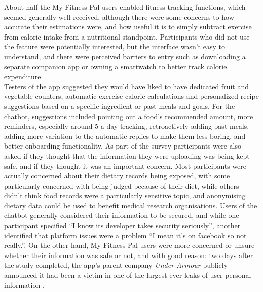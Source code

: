 About half the My Fitness Pal users enabled fitness tracking functions, which seemed generally well received, although there were some concerns to how accurate their estimations were, and how useful it is to simply subtract exercise from calorie intake from a nutritional standpoint. Participants who did not use the feature were potentially interested, but the interface wasn't easy to understand, and there were perceived barriers to entry such as downloading a separate companion app or owning a smartwatch to better track calorie expenditure.\\
Testers of the app suggested they would have liked to have dedicated fruit and vegetable counters, automatic exercise calorie calculations and personalized recipe suggestions based on a specific ingredient or past meals and goals. For the chatbot, suggestions included pointing out a food's recommended amount, more reminders, especially around 5-a-day tracking, retroactively adding past meals, adding more variation to the automatic replies to make them less boring, and better onboarding functionality.
As part of the survey participants were  also asked if they thought that the information they were uploading was being kept safe, and if they thought it was an important concern. Most participants were actually concerned about their dietary records being exposed, with some particularly concerned with being judged because of their diet, while others didn't think food records were a particularly sensitive topic, and anonymising dietary data could be used to benefit medical research organisations. Users of the chatbot generally considered their information to be secured, and while one participant specified ``I know its developer takes security seriously'', another identified that platform issues were a problem ``I mean it's on facebook so not really.''. On the other hand, My Fitness Pal users were more concerned or unsure whether their information was safe or not, and with good reason: two days after the study completed, the app's parent company \textit{Under Armour} publicly announced it had been a victim in one of the largest ever leaks of user personal information \cite{underarmour}.